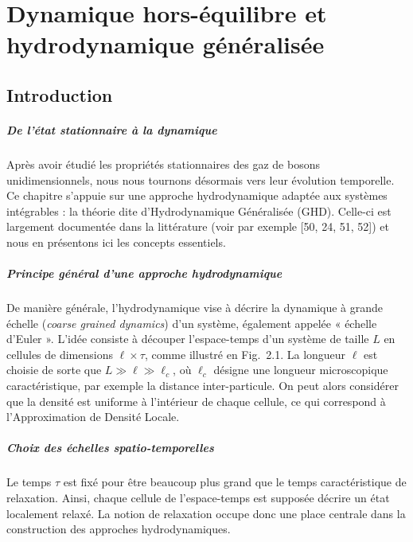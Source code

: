 \chapter{Dynamique hors-équilibre et hydrodynamique généralisée}
\label{chap:GHD}
\minitoc


\section*{Introduction}


\paragraph{De l’état stationnaire à la dynamique}  
Après avoir étudié les propriétés stationnaires des gaz de bosons unidimensionnels, nous nous tournons désormais vers leur évolution temporelle. Ce chapitre s’appuie sur une approche hydrodynamique adaptée aux systèmes intégrables : la théorie dite d’Hydrodynamique Généralisée (GHD). Celle-ci est largement documentée dans la littérature (voir par exemple [50, 24, 51, 52]) et nous en présentons ici les concepts essentiels.

\paragraph{Principe général d’une approche hydrodynamique}  
De manière générale, l’hydrodynamique vise à décrire la dynamique à grande échelle (\emph{coarse grained dynamics}) d’un système, également appelée « échelle d’Euler ». L’idée consiste à découper l’espace-temps d’un système de taille $L$ en cellules de dimensions $\ell \times \tau$, comme illustré en Fig.~2.1.  
La longueur $\ell$ est choisie de sorte que $L \gg \ell \gg \ell_c$, où $\ell_c$ désigne une longueur microscopique caractéristique, par exemple la distance inter-particule. On peut alors considérer que la densité est uniforme à l’intérieur de chaque cellule, ce qui correspond à l’Approximation de Densité Locale.

\paragraph{Choix des échelles spatio-temporelles}  
Le temps $\tau$ est fixé pour être beaucoup plus grand que le temps caractéristique de relaxation. Ainsi, chaque cellule de l’espace-temps est supposée décrire un état localement relaxé. La notion de relaxation occupe donc une place centrale dans la construction des approches hydrodynamiques.

